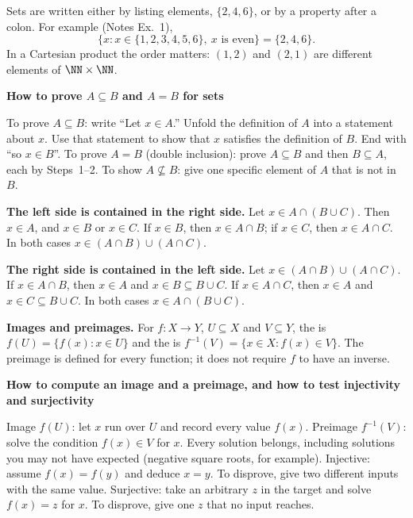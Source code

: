 \documentclass[10pt]{scrartcl}
\newenvironment{methodbox}[1]{\begin{mdframed}[style=methodstyle]\textbf{\color{NavyBlue}#1}\par\vspace{2pt}}{\end{mdframed}}
\begin{document}
Sets are written either by listing elements, $\{2,4,6\}$, or by a property after a colon. For example (Notes Ex.~1),
\[
  \{x : x\in\{1,2,3,4,5,6\},\ x\text{ is even}\}=\{2,4,6\}.
\]
In a Cartesian product the order matters: $(1,2)$ and $(2,1)$ are different elements of $\NN\times\NN$.

\begin{methodbox}{How to prove $A\subseteq B$ and $A=B$ for sets}
  \begin{steps}
    \ii To prove $A\subseteq B$: write ``Let $x\in A$.'' Unfold the definition of $A$ into a statement about $x$.
    \ii Use that statement to show that $x$ satisfies the definition of $B$. End with ``so $x\in B$''.
    \ii To prove $A=B$ (double inclusion): prove $A\subseteq B$ and then $B\subseteq A$, each by Steps~1--2.
    \ii To show $A\not\subseteq B$: give one specific element of $A$ that is not in $B$.
  \end{steps}
\end{methodbox}

\begin{example*}[Double inclusion: $A\cap(B\cup C)=(A\cap B)\cup(A\cap C)$]
  \textbf{The left side is contained in the right side.} Let $x\in A\cap(B\cup C)$. Then $x\in A$, and $x\in B$ or $x\in C$. If $x\in B$, then $x\in A\cap B$; if $x\in C$, then $x\in A\cap C$. In both cases $x\in(A\cap B)\cup(A\cap C)$.

  \textbf{The right side is contained in the left side.} Let $x\in(A\cap B)\cup(A\cap C)$. If $x\in A\cap B$, then $x\in A$ and $x\in B\subseteq B\cup C$. If $x\in A\cap C$, then $x\in A$ and $x\in C\subseteq B\cup C$. In both cases $x\in A\cap(B\cup C)$.
\end{example*}

\textbf{Images and preimages.} For $f\colon X\to Y$, $U\subseteq X$ and $V\subseteq Y$, the  is $f(U)=\{f(x):x\in U\}$ and the  is $f^{-1}(V)=\{x\in X:f(x)\in V\}$. The preimage is defined for every function; it does not require $f$ to have an inverse.

\begin{methodbox}{How to compute an image and a preimage, and how to test injectivity and surjectivity}
  \begin{steps}
    \ii Image $f(U)$: let $x$ run over $U$ and record every value $f(x)$.
    \ii Preimage $f^{-1}(V)$: solve the condition $f(x)\in V$ for $x$. Every solution belongs, including solutions you may not have expected (negative square roots, for example).
    \ii Injective: assume $f(x)=f(y)$ and deduce $x=y$. To disprove, give two different inputs with the same value.
    \ii Surjective: take an arbitrary $z$ in the target and solve $f(x)=z$ for $x$. To disprove, give one $z$ that no input reaches.
  \end{steps}
\end{methodbox}
\end{document}
